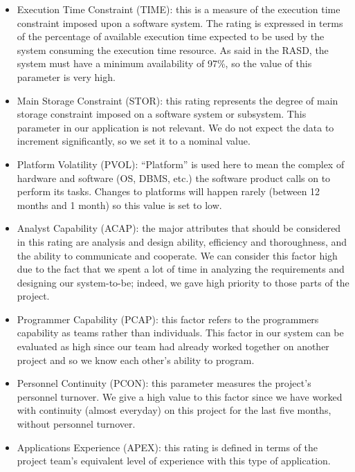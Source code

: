 \begin{itemize}
    \item Execution Time Constraint (TIME): this is a measure of the execution time constraint imposed upon a software system. The rating is expressed in terms of the percentage of available execution time expected to be used by the system consuming the execution time resource.
        \newline
        As said in the RASD, the system must have a minimum availability of 97\%, so the value of this parameter is very high. 
    \item Main Storage Constraint (STOR): this rating represents the degree of main storage constraint imposed on a software system or subsystem.
        \newline
        This parameter in our application is not relevant. We do not expect the data to increment significantly, so we set it to a nominal value.
    \item Platform Volatility (PVOL): “Platform” is used here to mean the complex of hardware and software (OS, DBMS, etc.) the software product calls on to perform its tasks.
        \newline
        Changes to platforms will happen rarely (between 12 months and 1 month) so this value is set to low.
    \item Analyst Capability (ACAP): the major attributes that should be considered in this rating are analysis and design ability, efficiency and thoroughness, and the ability to communicate and cooperate.
        \newline 
        We can consider this factor high due to the fact that we spent a lot of time in analyzing the requirements and designing our system-to-be; indeed, we gave high priority to those parts of the project. 
    \item Programmer Capability (PCAP): this factor refers to the programmers capability as teams rather than individuals.
        \newline 
        This factor in our system can be evaluated as high since our team had already worked together on another project and so we know each other's ability to program. 
    \item Personnel Continuity (PCON): this parameter measures the project’s personnel turnover. 
        \newline 
        We give a high value to this factor since we have worked with continuity (almost everyday) on this project for the last five months, without personnel turnover. 
    \item Applications Experience (APEX): this rating is defined in terms of the project team’s equivalent level of experience with this type of application.

\end{itemize}
